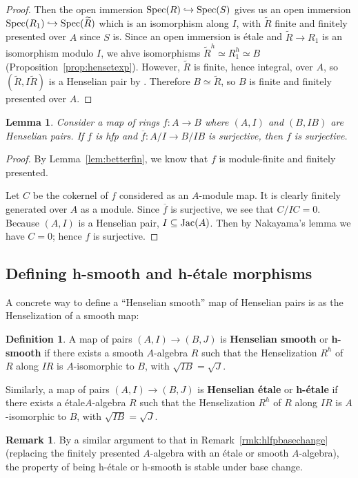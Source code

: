 \documentclass[12pt]{article}
\newcommand{\spec}{{\rm Spec}}
\newcommand{\Jac}{{\rm Jac}}
\newcommand{\ol}[1]{\overline{#1}}
\newcommand{\Et}{\'etale\xspace}
\newcommand{\hfp}{hfp\xspace}
\newcommand{\hetale}{h-\'etale\xspace}
\newcommand{\hsmooth}{h-smooth\xspace}
\newcommand{\spcite}[2]{\cite[\href{https://stacks.math.columbia.edu/tag/#1}{{#2} {#1}}]{stackp}}
\newtheorem{lemma}[theorem]{Lemma}
\theoremstyle{definition}
\newtheorem{definition}[theorem]{Definition}
\newtheorem{remark}[theorem]{Remark}
\numberwithin{equation}{subsection}
\begin{document}
\begin{proof}
Then the open immersion $\spec(R) \hookrightarrow \spec(S)$ gives us an open immersion $\spec(R_1) \hookrightarrow \spec(\widetilde{R})$ which is an isomorphism along $I$, with $\widetilde{R}$ finite and finitely presented over $A$ since $S$ is. Since an open immersion is \Et and $\widetilde{R} \to R_1$ is an isomorphism modulo $I$, we ahve isomorphisms $\widetilde{R}^h \simeq R_1^h \simeq B$ (Proposition~\ref{prop:hensetexp}). However, $\widetilde{R}$ is finite, hence integral, over $A$, so $(\widetilde{R},I\widetilde{R})$ is a Henselian pair by \spcite{09XK}{Lemma}. Therefore $B \simeq \widetilde{R}$, so $B$ is finite and finitely presented over $A$.\end{proof}

\begin{lemma}\label{lem:surj} Consider a map of rings $f: A \to B$ where $(A,I)$ and $(B,IB)$ are Henselian pairs. If $f$ is \hfp and $\ol{f}: A/I \to B/IB$ is surjective, then $f$ is surjective.
\end{lemma}
\begin{proof} By Lemma~\ref{lem:betterfin}, we know that $f$ is module-finite and finitely presented. 

Let $C$ be the cokernel of $f$ considered as an $A$-module map. It is clearly finitely generated over $A$ as a module. Since $\ol{f}$ is surjective, we see that $C/IC = 0$. Because $(A,I)$ is a Henselian pair, $I \subseteq \Jac(A)$. Then by Nakayama's lemma we have $C=0$; hence $f$ is surjective.\end{proof}

\subsection{Defining \hsmooth and \hetale morphisms}

A concrete way to define a ``Henselian smooth'' map of Henselian pairs is as the Henselization of a smooth map:

\begin{definition}\label{def:hsmet}
A map of pairs $(A,I) \to (B,J)$  is {\bf Henselian smooth} or {\bf \hsmooth} if there exists a smooth $A$-algebra $R$ such that the Henselization $R^h$ of $R$ along $IR$ is $A$-isomorphic to $B$, with $\sqrt{IB}=\sqrt{J}$.

Similarly, a map of pairs $(A,I) \to (B,J)$  is {\bf Henselian \'etale} or {\bf \hetale} if there exists a \Et $A$-algebra $R$ such that the Henselization $R^h$ of $R$ along $IR$ is $A$-isomorphic to $B$, with $\sqrt{IB}=\sqrt{J}$.
\end{definition}
\begin{remark}\label{rmk:hsmetbasechange}
By a similar argument to that in Remark~\ref{rmk:hlfpbasechange} (replacing the finitely presented $A$-algebra with an \Et or smooth $A$-algebra), the property of being \hetale or \hsmooth is stable under base change.\end{remark}
\end{document}
